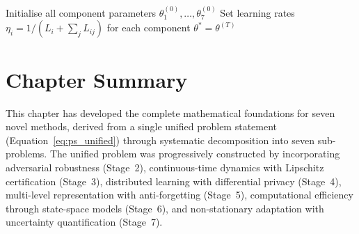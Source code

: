 \begin{algorithm}[htbp]
\caption{Unified Framework: Alternating Optimisation with Consistency Coupling}\label{alg:unified}
Initialise all component parameters $\theta_1^{(0)},\ldots,\theta_7^{(0)}$\;
Set learning rates $\eta_i = 1/(L_i + \sum_j L_{ij})$ for each component\;
\Return $\theta^* = \theta^{(T)}$
\end{algorithm}


\section{Chapter Summary}
\label{sec:ch2_summary}

This chapter has developed the complete mathematical foundations for seven novel methods, derived from a single unified problem statement (Equation~\eqref{eq:ps_unified}) through systematic decomposition into seven sub-problems. The unified problem was progressively constructed by incorporating adversarial robustness (Stage~2), continuous-time dynamics with Lipschitz certification (Stage~3), distributed learning with differential privacy (Stage~4), multi-level representation with anti-forgetting (Stage~5), computational efficiency through state-space models (Stage~6), and non-stationary adaptation with uncertainty quantification (Stage~7).

